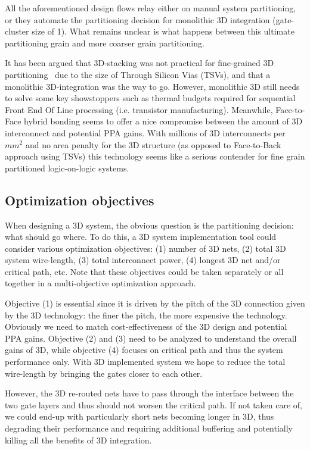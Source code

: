 \documentclass[conference]{IEEEtran}
\begin{document}
All the aforementioned design flows relay either on manual system partitioning, or they automate the partitioning decision for monolithic 3D integration (gate-cluster size of 1). What remains unclear is what happens between this ultimate partitioning grain and more coarser grain partitioning.  

It has been argued that 3D-stacking was not practical for fine-grained 3D partitioning~\cite{Samal2017} due to the size of Through Silicon Vias (TSVs), and that a monolithic 3D-integration was the way to go. However, monolithic 3D still needs to solve some key showstoppers such as thermal budgets required for sequential Front End Of Line processing (i.e. transistor manufacturing). Meanwhile, Face-to-Face hybrid bonding seems to offer a nice compromise between the amount of 3D interconnect and potential PPA gains. With millions of 3D interconnects per $mm^2$ and no area penalty for the 3D structure (as opposed to Face-to-Back approach using TSVs) this technology seems like a serious contender for fine grain partitioned logic-on-logic systems.

\subsection{Optimization objectives}
When designing a 3D system, the obvious question is the partitioning decision: what should go where. To do this, a 3D system implementation tool could consider various optimization objectives: (1) number of 3D nets, (2) total 3D system wire-length, (3) total interconnect power, (4) longest 3D net and/or critical path, 
etc. Note that these objectives could be taken separately or all together in a multi-objective optimization approach.

Objective (1) is essential since it is driven by the pitch of the 3D connection given by the 3D technology: the finer the pitch, the more expensive the technology. Obviously we need to match cost-effectiveness of the 3D design and potential PPA gains. Objective (2) and (3) need to be analyzed to understand the overall gains of 3D, while objective (4) focuses on critical path and thus the system performance only. With 3D implemented system we hope to reduce the total wire-length by bringing the gates closer to each other. 

However, the 3D re-routed nets have to pass through the interface between the two gate layers and thus should not worsen the critical path. If not taken care of, we could end-up with particularly short nets becoming longer in 3D, thus degrading their performance and requiring additional buffering and potentially killing all the benefits of 3D integration.
\end{document}
